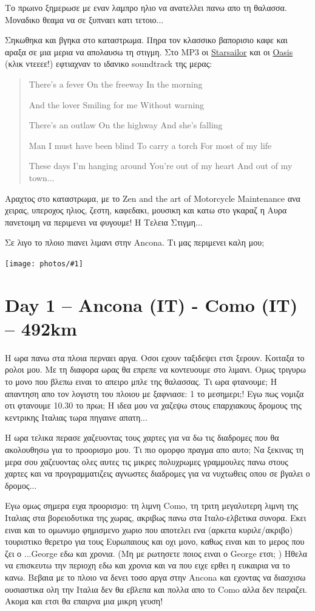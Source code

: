 \documentclass[11pt, letterpaper]{book}
\newcommand\photo[1]{\begin{center}\noindent\texttt{[image: photos/\#1]}\end{center}}
\begin{document}
Το πρωινο ξημερωσε με εναν λαμπρο ηλιο να ανατελλει πανω απο τη θαλασσα. Μοναδικο θεαμα να σε ξυπναει κατι τετοιο...

Σηκωθηκα και βγηκα στο καταστρωμα. Πηρα τον κλασσικο βαπορισιο καφε και αραξα σε μια μερια να απολαυσω τη στιγμη. Στο MP3 οι \href{http://goo.gl/HcaG4}{Starsailor} και οι \href{http://goo.gl/6sdDG}{Oasis} (κλικ ντεεεε!) εφτιαχναν το ιδανικο soundtrack της μερας:

\begin{verse}
There's a fever
On the freeway
In the morning

And the lover
Smiling for me
Without warning

There's an outlaw
On the highway
And she's falling

Man I must have been blind
To carry a torch
For most of my life

These days I'm hanging around
You're out of my heart
And out of my town...
\end{verse}

Αραχτος στο καταστρωμα, με το Zen and the art of Motorcycle Maintenance ανα χειρας, υπεροχος ηλιος, ζεστη, καφεδακι, μουσικη και κατω στο γκαραζ η Αυρα πανετοιμη να περιμενει να φυγουμε! Η Τελεια Στιγμη...

Σε λιγο το πλοιο πιανει λιμανι στην Ancona. Τι μας περιμενει καλη μου;

\photo{5.jpg}

\chapter{Day 1 -- Ancona (IT) - Como (IT) -- 492km}

Η ωρα πανω στα πλοια περναει αργα. Οσοι εχουν ταξιδεψει ετσι ξερουν. Κοιταξα το ρολοι μου. Με τη διαφορα ωρας θα επρεπε να κοντευουμε στο λιμανι. Ομως τριγυρω το μονο που βλεπω ειναι το απειρο μπλε της θαλασσας. Τι ωρα φτανουμε; Η απαντηση απο τον λογιστη του πλοιου με ξαφνιασε: 1 το μεσημερι;! Εγω πως νομιζα οτι φτανουμε 10.30 το πρωι; Η ιδεα μου να χαζεψω στους επαρχιακους δρομους της κεντρικης Ιταλιας τωρα πηγαινε απατη...

Η ωρα τελικα περασε χαζευοντας τους χαρτες για να δω τις διαδρομες που θα ακολουθησω για το προορισμο μου. Τι πιο ομορφο πραγμα απο αυτο; Να ξεκινας τη μερα σου χαζευοντας ολες αυτες τις μικρες πολυχρωμες γραμμουλες πανω στους χαρτες και να προγραμματιζεις αγνωστες διαδρομες για να νυχτωθεις οπου σε βγαλει ο δρομος...

Εγω ομως σημερα ειχα προορισμο: τη λιμνη Como, τη τριτη μεγαλυτερη λιμνη της Ιταλιας στα βορειοδυτικα της χωρας, ακριβως πανω στα Ιταλο-ελβετικα συνορα. Εκει ειναι και το ομωνυμο φημισμενο χωριο που αποτελει ενα (αρκετα κυριλε/ακριβο) τουριστικο θερετρο για τους Ευρωπαιους και οχι μονο, καθως ειναι και το μερος που ζει ο ...George εδω και χρονια. (Μη με ρωτησετε ποιος ειναι ο George ετσι; )
Ηθελα να επισκευτω την περιοχη εδω και χρονια και να που ειχε ερθει η ευκαιρια να το κανω. Βεβαια με το πλοιο να δενει τοσο αργα στην Ancona και εχοντας να διασχισω ουσιαστικα ολη την Ιταλια δεν θα εβλεπα και πολλα απο το Como αλλα δεν πειραζει. Ακομα και ετσι θα επαιρνα μια μικρη γευση!
\end{document}
